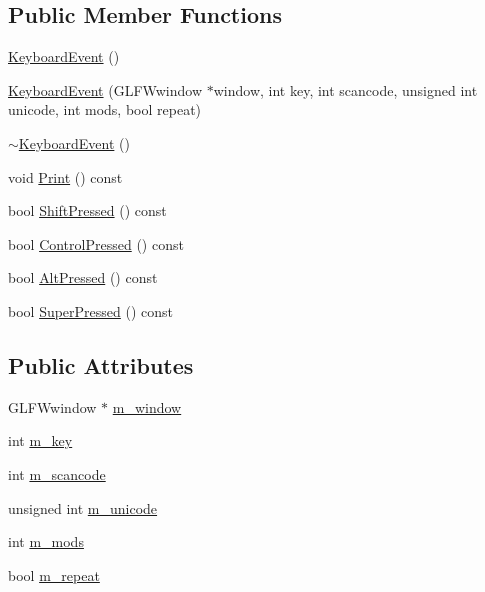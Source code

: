 \subsection*{Public Member Functions}
\begin{DoxyCompactItemize}
\item 
\mbox{\hyperlink{structec_1_1_keyboard_event_a7bec67ef8aff46a11e0472a73e9b6916}{Keyboard\+Event}} ()
\item 
\mbox{\hyperlink{structec_1_1_keyboard_event_a2914ab97f4705f779d630a4c1dbcf4b6}{Keyboard\+Event}} (G\+L\+F\+Wwindow $\ast$window, int key, int scancode, unsigned int unicode, int mods, bool repeat)
\item 
\mbox{\hyperlink{structec_1_1_keyboard_event_a7631a5a8d33373e6b6d739235815dee4}{$\sim$\+Keyboard\+Event}} ()
\item 
void \mbox{\hyperlink{structec_1_1_keyboard_event_a033618c76a50e0cffa9f8436e2d05696}{Print}} () const
\item 
bool \mbox{\hyperlink{structec_1_1_keyboard_event_a8401b4d9804058b860adbfe3922b5445}{Shift\+Pressed}} () const
\item 
bool \mbox{\hyperlink{structec_1_1_keyboard_event_aa9eb537bc4c63cdc9e5d26812a4373e6}{Control\+Pressed}} () const
\item 
bool \mbox{\hyperlink{structec_1_1_keyboard_event_aebc4ed65b09e0fa607939362d96248b4}{Alt\+Pressed}} () const
\item 
bool \mbox{\hyperlink{structec_1_1_keyboard_event_a46d2beaca43511fe135554a673c42402}{Super\+Pressed}} () const
\end{DoxyCompactItemize}
\subsection*{Public Attributes}
\begin{DoxyCompactItemize}
\item 
G\+L\+F\+Wwindow $\ast$ \mbox{\hyperlink{structec_1_1_keyboard_event_a6de06c21e83612aeca727beedd93ae82}{m\+\_\+window}}
\item 
int \mbox{\hyperlink{structec_1_1_keyboard_event_a3748aaf86e02d8e2f458f5135edc9e3d}{m\+\_\+key}}
\item 
int \mbox{\hyperlink{structec_1_1_keyboard_event_a99de30a0a1504392405bbcfee3debd57}{m\+\_\+scancode}}
\item 
unsigned int \mbox{\hyperlink{structec_1_1_keyboard_event_a530cc03b6d62e8068694756426222909}{m\+\_\+unicode}}
\item 
int \mbox{\hyperlink{structec_1_1_keyboard_event_afd3db99c42980b15922c83d4bd0ccd5c}{m\+\_\+mods}}
\item 
bool \mbox{\hyperlink{structec_1_1_keyboard_event_ad9cc081843fb355f7f1b2a5d7b96b026}{m\+\_\+repeat}}
\end{DoxyCompactItemize}


